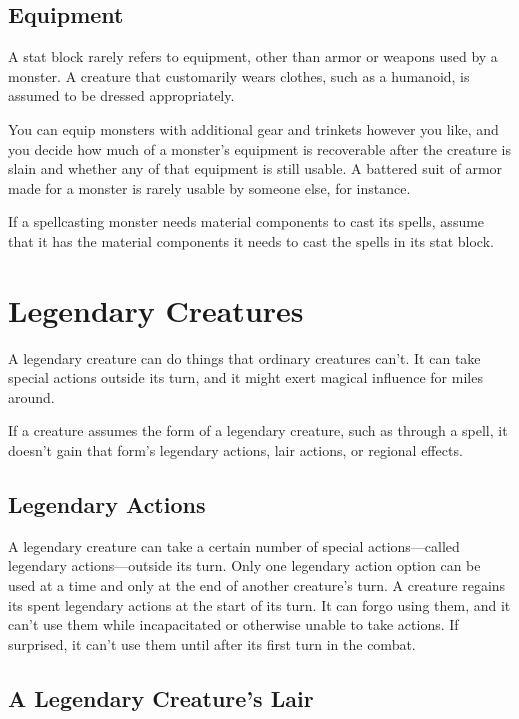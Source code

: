 \subsection{Equipment}

A stat block rarely refers to equipment, other than armor or weapons used by a monster. A creature that customarily wears clothes, such as a humanoid, is assumed to be dressed appropriately.

You can equip monsters with additional gear and trinkets however you like, and you decide how much of a monster's equipment is recoverable after the creature is slain and whether any of that equipment is still usable. A battered suit of armor made for a monster is rarely usable by someone else, for instance.

If a spellcasting monster needs material components to cast its spells, assume that it has the material components it needs to cast the spells in its stat block.

\section{Legendary Creatures}

A legendary creature can do things that ordinary creatures can't. It can take special actions outside its turn, and it might exert magical influence for miles around.

If a creature assumes the form of a legendary creature, such as through a spell, it doesn't gain that form's legendary actions, lair actions, or regional effects.

\subsection{Legendary Actions}

A legendary creature can take a certain number of special actions—called legendary actions—outside its turn. Only one legendary action option can be used at a time and only at the end of another creature's turn. A creature regains its spent legendary actions at the start of its turn. It can forgo using them, and it can't use them while incapacitated or otherwise unable to take actions. If surprised, it can't use them until after its first turn in the combat.

\subsection{A Legendary Creature's Lair}

